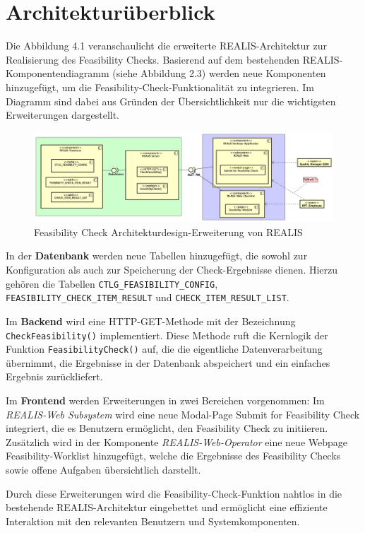 \section{Architekturüberblick}

Die Abbildung 4.1 veranschaulicht die erweiterte REALIS-Architektur zur Realisierung des Feasibility Checks. Basierend auf dem bestehenden REALIS-Komponentendiagramm (siehe Abbildung 2.3) werden neue Komponenten hinzugefügt, um die Feasibility-Check-Funktionalität zu integrieren. Im Diagramm sind dabei aus Gründen der Übersichtlichkeit nur die wichtigsten Erweiterungen dargestellt.

\begin{figure}[!htbp]
    \centering
    \includegraphics[width=1\textwidth]{bilder/Feasibility-Komponentendiagramm.png}
    \caption{Feasibility Check Architekturdesign-Erweiterung von \gls{REALIS}}
    \label{fig:feasibility-check-komponentendiagramm}
\end{figure}


In der \textbf{Datenbank} werden neue Tabellen hinzugefügt, die sowohl zur Konfiguration als auch zur Speicherung der Check-Ergebnisse dienen. Hierzu gehören die Tabellen \texttt{CTLG\_FEASIBILITY\_CONFIG}, \texttt{FEASIBILITY\_CHECK\_ITEM\_RESULT} und \texttt{CHECK\_ITEM\_\-RESULT\_\-LIST}.

Im \textbf{Backend} wird eine HTTP-GET-Methode mit der Bezeichnung \texttt{CheckFeasibility()} implementiert. Diese Methode ruft die Kernlogik der Funktion \texttt{FeasibilityCheck()} auf, die die eigentliche Datenverarbeitung übernimmt, die Ergebnisse in der Datenbank abspeichert und ein einfaches Ergebnis zurückliefert.

Im \textbf{Frontend} werden Erweiterungen in zwei Bereichen vorgenommen: Im \textit{REALIS-Web Subsystem} wird eine neue Modal-Page \glqq Submit for Feasibility Check\grqq{} integriert, die es Benutzern ermöglicht, den Feasibility Check zu initiieren. Zusätzlich wird in der Komponente \textit{REALIS-Web-Operator} eine neue Webpage \glqq Feasibility-Worklist\grqq{} hinzugefügt, welche die Ergebnisse des Feasibility Checks sowie offene Aufgaben übersichtlich darstellt.

Durch diese Erweiterungen wird die Feasibility-Check-Funktion nahtlos in die bestehende REALIS-Architektur eingebettet und ermöglicht eine effiziente Interaktion mit den relevanten Benutzern und Systemkomponenten.


